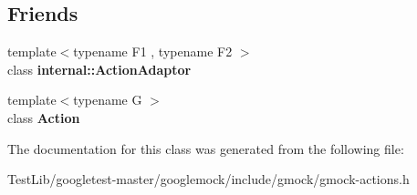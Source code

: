 \subsection*{Friends}
\begin{DoxyCompactItemize}
\item 
\mbox{\label{classtesting_1_1Action_a66fe4f9c9b9d020273151aa6054b491e}} 
{\footnotesize template$<$typename F1 , typename F2 $>$ }\\class {\bfseries internal\+::\+Action\+Adaptor}
\item 
\mbox{\label{classtesting_1_1Action_a62bc48ff11968b6e45d21c4b49f349fb}} 
{\footnotesize template$<$typename G $>$ }\\class {\bfseries Action}
\end{DoxyCompactItemize}


The documentation for this class was generated from the following file\+:\begin{DoxyCompactItemize}
\item 
Test\+Lib/googletest-\/master/googlemock/include/gmock/gmock-\/actions.\+h\end{DoxyCompactItemize}
